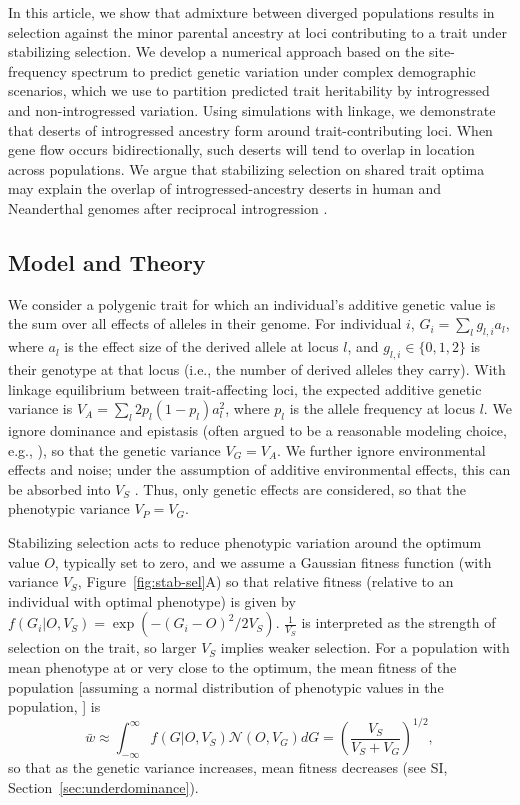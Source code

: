\documentclass{article}
\begin{document}
In this article, we show that admixture between diverged populations results in
selection against the minor parental ancestry at loci contributing to a trait
under stabilizing selection. We develop a numerical approach based on the
site-frequency spectrum to predict genetic variation under complex demographic
scenarios, which we use to partition predicted trait heritability by
introgressed and non-introgressed variation. Using simulations with linkage, we
demonstrate that deserts of introgressed ancestry form around
trait-contributing loci. When gene flow occurs bidirectionally, such deserts
will tend to overlap in location across populations. We argue that stabilizing
selection on shared trait optima may explain the overlap of
introgressed-ancestry deserts in human and Neanderthal genomes after reciprocal
introgression \citep{harris2023diverse}.


\subsection*{Model and Theory}

We consider a polygenic trait for which an individual's additive genetic value
is the sum over all effects of alleles in their genome. For individual $i$,
\(G_i = \sum_l g_{l, i} a_l\), where $a_l$ is the effect size of the derived
allele at locus $l$, and \(g_{l,i}\in\{0,1,2\}\) is their genotype at that
locus (i.e., the number of derived alleles they carry). With linkage
equilibrium between trait-affecting loci, the expected additive genetic
variance is \(V_A = \sum_l 2p_l(1-p_l)a_l^2\), where $p_l$ is the allele
frequency at locus $l$. We ignore dominance and epistasis (often argued to be a
reasonable modeling choice, e.g., \citet{barton2002understanding,
zhang2002pleiotropic}), so that the genetic variance \(V_G = V_A\). We further
ignore environmental effects and noise; under the assumption of additive
environmental effects, this can be absorbed into $V_S$
\citep{lande1975maintenance, simons2018population}. Thus, only genetic effects
are considered, so that the phenotypic variance \(V_P=V_G\).

Stabilizing selection acts to reduce phenotypic variation around the optimum
value $O$, typically set to zero, and we assume a Gaussian fitness function
(with variance $V_S$, Figure~\ref{fig:stab-sel}A) so that relative fitness
(relative to an individual with optimal phenotype) is given by \(f(G_i | O,
V_S) = \exp{(-(G_i - O)^2 / 2 V_S)}\). $\frac{1}{V_S}$ is interpreted as the
strength of selection on the trait, so larger $V_S$ implies weaker selection.
For a population with mean phenotype at or very close to the optimum, the
mean fitness of the population [assuming a normal distribution of phenotypic
values in the population, \citep{turelli1994genetic, urban2013asymmetric}] is
\[\bar{w} \approx \int_{-\infty}^\infty
f(G | O, V_S) \mathcal{N}(O, V_G) dG =
\left(\frac{V_S}{V_S+V_G}\right)^{1/2},\]
so that as the genetic variance increases, mean fitness decreases (see
SI, Section~\ref{sec:underdominance}).
\end{document}

